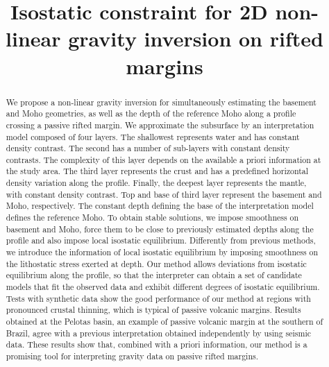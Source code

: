 \documentclass[manuscript]{geophysics}
\begin{document}
\title{Isostatic constraint for 2D non-linear gravity inversion on rifted margins}

\renewcommand{\thefootnote}{\fnsymbol{footnote}} 




\maketitle

\begin{abstract}

We propose a non-linear gravity inversion for simultaneously estimating the 
basement and Moho geometries, as well as the depth of the reference Moho 
along a profile crossing a passive rifted margin. We approximate the subsurface 
by an interpretation model composed of four layers. The shallowest represents 
water and has constant density contrast. The second has a number of sub-layers 
with constant density contrasts. The complexity of this layer depends on the 
available a priori information at the study area. The third layer represents 
the crust and has a predefined horizontal density variation along the profile. 
Finally, the deepest layer represents the mantle, with constant density contrast. 
Top and base of third layer represent the basement and Moho, respectively. 
The constant depth defining the base of the interpretation model defines the 
reference Moho. To obtain stable solutions, we impose smoothness on basement 
and Moho, force them to be close to previously estimated depths along the 
profile and also impose local isostatic equilibrium. Differently from previous 
methods, we introduce the information of local isostatic equilibrium by imposing 
smoothness on the lithostatic stress exerted at depth. Our method allows deviations 
from isostatic equilibrium along the profile, so that the interpreter can obtain a 
set of candidate models that fit the observed data and exhibit different degrees 
of isostatic equilibrium. Tests with synthetic data show the good performance of 
our method at regions with pronounced crustal thinning, which is typical of 
passive volcanic margins. Results obtained at the Pelotas basin, an example of 
passive volcanic margin at the southern of Brazil, agree with a previous 
interpretation obtained independently by using seismic data. These results 
show that, combined with a priori information, our method is a promising tool 
for interpreting gravity data on passive rifted margins.


\end{abstract}
\end{document}
